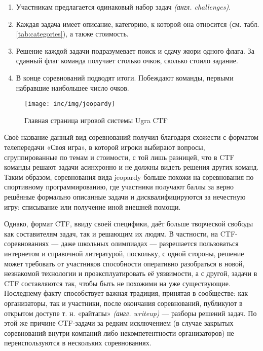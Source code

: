 \begin{enumerate}
  \item Участникам предлагается одинаковый набор задач \textit{(англ. challenges)}.
  \item Каждая задача имеет описание, категорию, к которой она относится (см. табл. \ref{tab:categories}), а также стоимость.
  \item Решение каждой задачи подразумевает поиск и сдачу жюри одного флага. За сданный флаг команда получает столько очков, сколько стоило задание.
  \item В конце соревнований подводят итоги. Побеждают команды, первыми набравшие наибольшее число очков.
\end{enumerate}

\begin{figure}
  \centering
  \texttt{[image: inc/img/jeopardy]}
  \caption{Главная страница игровой системы Ugra CTF}
  \label{fig:jeopardy}
\end{figure}


Своё название данный вид соревнований получил благодаря схожести с форматом телепередачи «Своя игра», в которой игроки выбирают вопросы, сгруппированные по темам и стоимости, с той лишь разницей, что в CTF команды решают задачи асинхронно и не должны видеть решения других команд. Таким образом, соревнования вида jeopardy больше похожи на соревнования по спортивному программированию, где участники получают баллы за верно решённые формально описанные задачи и дисквалифицируются за нечестную игру: списывание или получение иной внешней помощи.

Однако, формат CTF, ввиду своей специфики, даёт больше творческой свободы как составителям задач, так и решающим их людям. В частности, на CTF-соревнованиях --- даже школьных олимпиадах --- разрешается пользоваться интернетом и справочной литературой, поскольку, с одной стороны, решение может требовать от участников способности оперативно разобраться в новой, незнакомой технологии и проэксплуатировать её уязвимости, а с другой, задачи в CTF составляются так, чтобы быть не похожими на уже существующие. Последнему факту способствует важная традиция, принятая в сообществе: как организаторы, так и участники, после окончания соревнований, публикуют в открытом доступе т. н. «райтапы» \textit{(англ. writeup)} --- разборы решений задач. По этой же причине CTF-задачи за редким исключением (в случае закрытых соревнований внутри компаний либо некомпетентности организаторов) не переиспользуются в нескольких соревнованиях.

